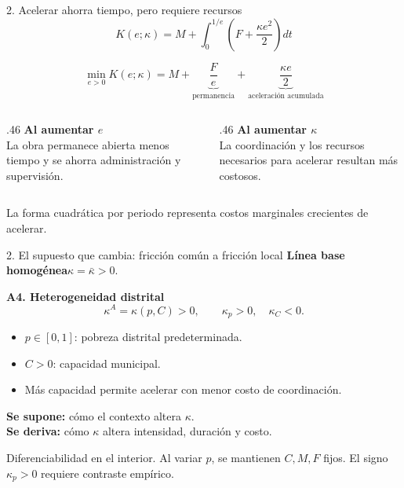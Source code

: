 \documentclass[11pt,aspectratio=169]{beamer}
\newcommand{\notefoot}[1]{\vfill{\scriptsize\color{navy!75}#1}}
\newcommand{\lead}[1]{\begin{block}{}#1\end{block}}
\begin{document}
\begin{frame}{2. Acelerar ahorra tiempo, pero requiere recursos}
\[
K(e;\kappa)=M+\int_0^{1/e}\left(F+\frac{\kappa e^2}{2}\right)dt
\]
\par\vspace{2mm}
\[
\boxed{\min_{e>0}K(e;\kappa)=M+\underbrace{\frac{F}{e}}_{\text{permanencia}}+
\underbrace{\frac{\kappa e}{2}}_{\text{aceleración acumulada}}}
\]
\begin{columns}[T,onlytextwidth]
\begin{column}{.46\textwidth}
\textbf{Al aumentar $e$}\\[2mm]
La obra permanece abierta menos tiempo y se ahorra administración y supervisión.
\end{column}
\begin{column}{.46\textwidth}
\textbf{Al aumentar $\kappa$}\\[2mm]
La coordinación y los recursos necesarios para acelerar resultan más costosos.
\end{column}
\end{columns}
\notefoot{La forma cuadrática por periodo representa costos marginales crecientes de acelerar.}
\end{frame}

\begin{frame}{2. El supuesto que cambia: fricción común a fricción local}
\textbf{Línea base homogénea}\qquad $\kappa=\bar\kappa>0$.
\par\vspace{4mm}
\textbf{A4. Heterogeneidad distrital}
\[
\kappa^A=\kappa(p,C)>0,\qquad\kappa_p>0,\quad\kappa_C<0.
\]
\begin{itemize}\setlength{\itemsep}{2mm}
\item $p\in[0,1]$: pobreza distrital predeterminada.
\item $C>0$: capacidad municipal.
\item Más capacidad permite acelerar con menor costo de coordinación.
\end{itemize}
\lead{\textbf{Se supone:} cómo el contexto altera $\kappa$.\\
\textbf{Se deriva:} cómo $\kappa$ altera intensidad, duración y costo.}
\notefoot{Diferenciabilidad en el interior. Al variar $p$, se mantienen $C,M,F$ fijos. El signo $\kappa_p>0$ requiere contraste empírico.}
\end{frame}
\end{document}
